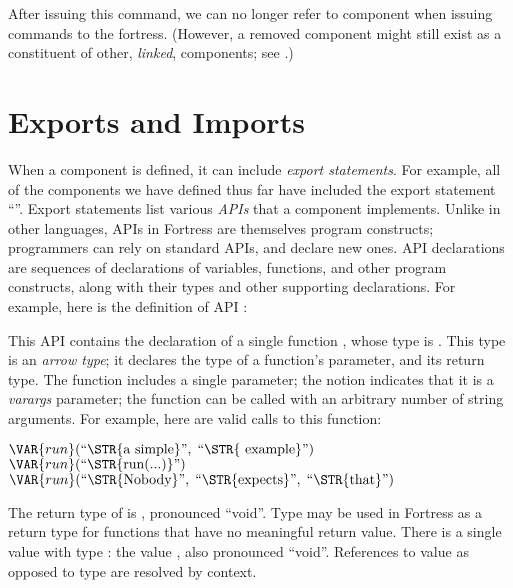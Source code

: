 After issuing this command, we can no longer refer to 
component when issuing commands to the fortress.
(However, a removed component might still exist as a constituent of other,
\emph{linked}, components; see .)

\label{overviewComponent}
\section{Exports and Imports}

When a component is defined, it can include \emph{export statements}.
For example,
all of the components we have defined thus far
have included the export statement ``''.
Export statements list various \emph{APIs}
that a component implements.
Unlike in other languages, APIs in
Fortress are themselves program constructs; programmers can rely on
standard APIs, and declare new ones. API declarations are sequences of
declarations of
variables, functions, and other program constructs, along with their
types and other
supporting declarations. For example, here is the definition of API
:


This API contains the declaration of a single function ,
whose type is . This type is an
\emph{arrow type}; it declares the type of a function's parameter,
and its return type. The function  includes a single
parameter; the notion  indicates that it is a
\emph{varargs} parameter; the function  can be called with an
arbitrary number of string arguments. For example, here are
valid calls to this function:

\begin{Fortress}
\(\VAR{run}(\hbox{\rm``\STR{a~simple}''},\;\hbox{\rm``\STR{~example}''})\)\\
\(\VAR{run}(\hbox{\rm``\STR{run(...)}''})\)\\
\(\VAR{run}(\hbox{\rm``\STR{Nobody}''},\;\hbox{\rm``\STR{expects}''},\;\hbox{\rm``\STR{that}''})\)
\end{Fortress}


The return type of  is \EXP{()}, pronounced ``void''.
Type \EXP{()} may be used in Fortress as a return type
for functions that have no meaningful return value.
There is a single value with type \EXP{()}:
the value \EXP{()}, also pronounced ``void''.
References to value \EXP{()} as opposed
to type \EXP{()} are resolved by context.

